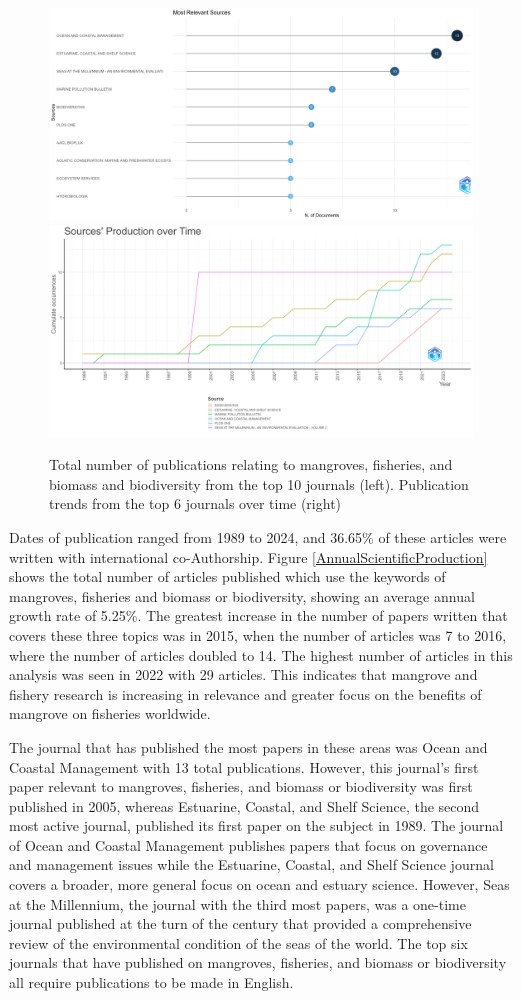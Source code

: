 \documentclass[
  12pt,
]{article}
\begin{document}
\begin{figure}
\includegraphics[width=0.5\linewidth]{MostRelevantSources} \includegraphics[width=0.5\linewidth]{SourceDynamics} \caption{Total number of publications relating to mangroves, fisheries, and biomass and biodiversity from the top 10 journals (left). Publication trends from the top 6 journals over time (right) \label{SourceDynamics}}\label{fig:SourceDynamics}
\end{figure}



Dates of publication ranged from 1989 to 2024, and 36.65\% of these articles were written with international co-Authorship. Figure \ref{AnnualScientificProduction} shows the total number of articles published which use the keywords of mangroves, fisheries and biomass or biodiversity, showing an average annual growth rate of 5.25\%. The greatest increase in the number of papers written that covers these three topics was in 2015, when the number of articles was 7 to 2016, where the number of articles doubled to 14. The highest number of articles in this analysis was seen in 2022 with 29 articles. This indicates that mangrove and fishery research is increasing in relevance and greater focus on the benefits of mangrove on fisheries worldwide.

The journal that has published the most papers in these areas was Ocean and Coastal Management with 13 total publications. However, this journal's first paper relevant to mangroves, fisheries, and biomass or biodiversity was first published in 2005, whereas Estuarine, Coastal, and Shelf Science, the second most active journal, published its first paper on the subject in 1989. The journal of Ocean and Coastal Management publishes papers that focus on governance and management issues while the Estuarine, Coastal, and Shelf Science journal covers a broader, more general focus on ocean and estuary science. However, Seas at the Millennium, the journal with the third most papers, was a one-time journal published at the turn of the century that provided a comprehensive review of the environmental condition of the seas of the world. The top six journals that have published on mangroves, fisheries, and biomass or biodiversity all require publications to be made in English.
\end{document}
